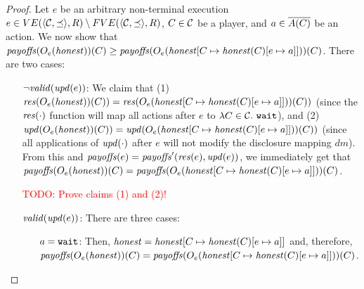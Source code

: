 \begin{proof}
Let $e$ be an arbitrary non-terminal execution $e \in VE(\tup{\coalitionSchema,\preceq},\rounds) \setminus FVE(\tup{\coalitionSchema,\preceq},\rounds)$, $C \in \coalitionSchema$ be a player, and $a \in \coalitionActions{C}$ be an action.
%
We now show that $\payoffs(\subgameOutcome{\honest}{e})(C) \geq \payoffs(\subgameOutcome{\honest[C \mapsto \honest(C)[e \mapsto a]]}{e})(C)$.
%
There are two cases:
\begin{itemize}
\item[$\neg \valid{\update{e}}$: ]
%
We claim that (1) $\conflict{\subgameOutcome{\honest}{e})(C)} = \conflict{\subgameOutcome{\honest[C \mapsto \honest(C)[e \mapsto a]]}{e})(C)}$ (since the $\conflict{\cdot}$ function will map all actions after $e$ to $\lambda C \in \coalitionSchema.\ \wait$), and (2) $\update{\subgameOutcome{\honest}{e})(C)} = \update{\subgameOutcome{\honest[C \mapsto \honest(C)[e \mapsto a]]}{e})(C)}$ (since all applications of $\update{\cdot}$ after $e$ will not modify the disclosure mapping $dm$).
%
From this and $\payoffs(e) = \payoffs'(\conflict{e}, \update{e})$, we immediately get that $\payoffs(\subgameOutcome{\honest}{e})(C) = \payoffs(\subgameOutcome{\honest[C \mapsto \honest(C)[e \mapsto a]]}{e})(C)$.

\textcolor{red}{TODO: Prove claims (1) and (2)!}

\item[$\valid{\update{e}}$: ]
%
There are three cases:
\begin{itemize}
\item[$a = \wait$:]
%
Then, $\honest = \honest[C \mapsto \honest(C)[e \mapsto a]]$ and, therefore, $\payoffs(\subgameOutcome{\honest}{e})(C) = \payoffs(\subgameOutcome{\honest[C \mapsto \honest(C)[e \mapsto a]]}{e})(C)$.


\end{itemize}
\end{itemize}
\end{proof}
